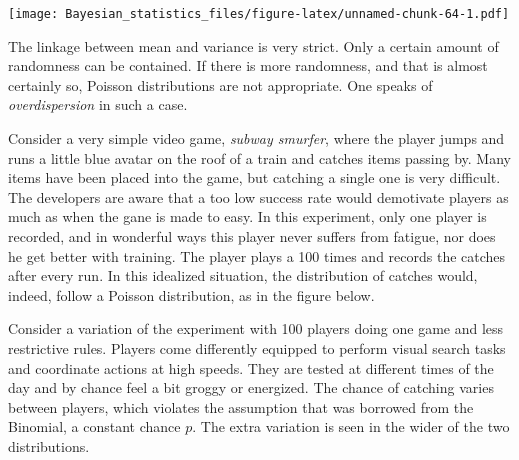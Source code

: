 \documentclass[]{svmono}
\newenvironment{Shaded}{\begin{snugshade}}{\end{snugshade}}
\newcommand{\KeywordTok}[1]{\textcolor[rgb]{0.13,0.29,0.53}{\textbf{#1}}}
\newcommand{\DataTypeTok}[1]{\textcolor[rgb]{0.13,0.29,0.53}{#1}}
\newcommand{\DecValTok}[1]{\textcolor[rgb]{0.00,0.00,0.81}{#1}}
\newcommand{\StringTok}[1]{\textcolor[rgb]{0.31,0.60,0.02}{#1}}
\newcommand{\OperatorTok}[1]{\textcolor[rgb]{0.81,0.36,0.00}{\textbf{#1}}}
\newcommand{\NormalTok}[1]{#1}
\theoremstyle{definition}
\theoremstyle{definition}
\theoremstyle{definition}
\theoremstyle{remark}
\begin{document}
\begin{Shaded}
\end{Shaded}

\texttt{[image: Bayesian\_statistics\_files/figure-latex/unnamed-chunk-64-1.pdf]}

The linkage between mean and variance is very strict. Only a certain
amount of randomness can be contained. If there is more randomness, and
that is almost certainly so, Poisson distributions are not appropriate.
One speaks of \emph{overdispersion} in such a case.

Consider a very simple video game, \emph{subway smurfer}, where the
player jumps and runs a little blue avatar on the roof of a train and
catches items passing by. Many items have been placed into the game, but
catching a single one is very difficult. The developers are aware that a
too low success rate would demotivate players as much as when the gane
is made to easy. In this experiment, only one player is recorded, and in
wonderful ways this player never suffers from fatigue, nor does he get
better with training. The player plays a 100 times and records the
catches after every run. In this idealized situation, the distribution
of catches would, indeed, follow a Poisson distribution, as in the
figure below.

Consider a variation of the experiment with 100 players doing one game
and less restrictive rules. Players come differently equipped to perform
visual search tasks and coordinate actions at high speeds. They are
tested at different times of the day and by chance feel a bit groggy or
energized. The chance of catching varies between players, which violates
the assumption that was borrowed from the Binomial, a constant chance
\(p\). The extra variation is seen in the wider of the two
distributions.
\end{document}
